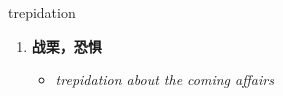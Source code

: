 
\begin{frame}
{\huge trepidation}
\begin{center}
\begin{enumerate}\Large
  \item \textbf{战栗，恐惧}
  \begin{itemize}
    \item \em{\Large{trepidation about the coming affairs}}
  \end{itemize}
\end{enumerate}
\end{center}
\end{frame}
